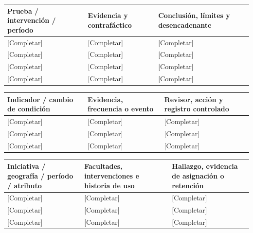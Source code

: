 {\sffamily\fontsize{8.3}{10.3}\selectfont\begin{longtable}{@{}P{52.79mm} P{59.39mm} P{52.79mm}@{}}
\toprule
\textbf{Prueba / intervención / período} & \textbf{Evidencia y contrafáctico} & \textbf{Conclusión, límites y desencadenante}\\\midrule\endhead
\rule{0pt}{7.7mm}[Completar] & [Completar] & [Completar]\\\hline
\rule{0pt}{7.7mm}[Completar] & [Completar] & [Completar]\\\hline
\rule{0pt}{7.7mm}[Completar] & [Completar] & [Completar]\\\hline
\rule{0pt}{7.7mm}[Completar] & [Completar] & [Completar]\\\hline
\end{longtable}}
{\sffamily\fontsize{8.3}{10.3}\selectfont\begin{longtable}{@{}P{52.79mm} P{57.74mm} P{54.44mm}@{}}
\toprule
\textbf{Indicador / cambio de condición} & \textbf{Evidencia, frecuencia o evento} & \textbf{Revisor, acción y registro controlado}\\\midrule\endhead
\rule{0pt}{7.7mm}[Completar] & [Completar] & [Completar]\\\hline
\rule{0pt}{7.7mm}[Completar] & [Completar] & [Completar]\\\hline
\rule{0pt}{7.7mm}[Completar] & [Completar] & [Completar]\\\hline
\end{longtable}}
{\sffamily\fontsize{8.3}{10.3}\selectfont\begin{longtable}{@{}P{56.09mm} P{56.09mm} P{52.79mm}@{}}
\toprule
\textbf{Iniciativa / geografía / período / atributo} & \textbf{Facultades, intervenciones e historia de uso} & \textbf{Hallazgo, evidencia de asignación o retención}\\\midrule\endhead
\rule{0pt}{7.7mm}[Completar] & [Completar] & [Completar]\\\hline
\rule{0pt}{7.7mm}[Completar] & [Completar] & [Completar]\\\hline
\rule{0pt}{7.7mm}[Completar] & [Completar] & [Completar]\\\hline
\end{longtable}}
